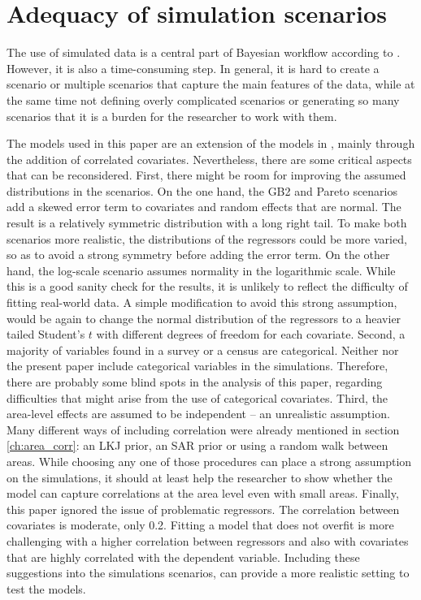 \section{Adequacy of simulation scenarios}
\label{ch:adequacy_simulations}

The use of simulated data is a central part of Bayesian workflow according to \cite{gelman_bayesian_2020}.
However, it is also a time-consuming step.
In general, it is hard to create a scenario or multiple scenarios that capture the main features of the data, while at the same time not defining overly complicated scenarios or generating so many scenarios that it is a burden for the researcher to work with them.

The models used in this paper are an extension of the models in \cite{rojas_perilla_data_2020}, mainly through the addition of correlated covariates.
Nevertheless, there are some critical aspects that can be reconsidered.
First, there might be room for improving the assumed distributions in the scenarios.
On the one hand, the GB2 and Pareto scenarios add a skewed error term to covariates and random effects that are normal.
The result is a relatively symmetric distribution with a long right tail.
To make both scenarios more realistic, the distributions of the regressors could be more varied, so as to avoid a strong symmetry before adding the error term.
On the other hand, the log-scale scenario assumes normality in the logarithmic scale.
While this is a good sanity check for the results, it is unlikely to reflect the difficulty of fitting real-world data.
A simple modification to avoid this strong assumption, would be again to change the normal distribution of the regressors to a heavier tailed Student's $t$ with different degrees of freedom for each covariate.
Second, a majority of variables found in a survey or a census are categorical.
Neither \cite{rojas_perilla_data_2020} nor the present paper include categorical variables in the simulations.
Therefore, there are probably some blind spots in the analysis of this paper, regarding difficulties that might arise from the use of categorical covariates.
Third, the area-level effects are assumed to be independent – an unrealistic assumption.
Many different ways of including correlation were already mentioned in section \ref{ch:area_corr}: an LKJ prior, an SAR prior or using a random walk between areas.
While choosing any one of those procedures can place a strong assumption on the simulations, it should at least help the researcher to show whether the model can capture correlations at the area level even with small areas.
Finally, this paper ignored the issue of problematic regressors.
The correlation between covariates is moderate, only 0.2.
Fitting a model that does not overfit is more challenging with a higher correlation between regressors and also with covariates that are highly correlated with the dependent variable.
Including these suggestions into the simulations scenarios, can provide a more realistic setting to test the models.

